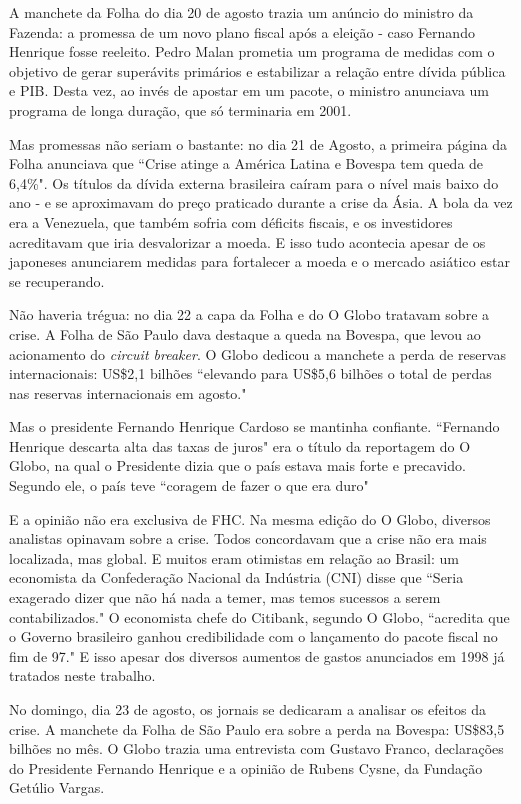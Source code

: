 \documentclass{article}
\begin{document}
A manchete da Folha do dia 20 de agosto trazia um anúncio do ministro da Fazenda: a promessa de um novo plano fiscal após a eleição - caso Fernando Henrique fosse reeleito. Pedro Malan prometia um programa de medidas com o objetivo de gerar superávits primários e estabilizar a relação entre dívida pública e PIB. Desta vez, ao invés de apostar em um pacote, o ministro anunciava um programa de longa duração, que só terminaria em 2001.

Mas promessas não seriam o bastante: no dia 21 de Agosto, a primeira página da Folha anunciava que ``Crise atinge a América Latina e Bovespa tem queda de 6,4\%". Os títulos da dívida externa brasileira caíram para o nível mais baixo do ano - e se aproximavam do preço praticado durante a crise da Ásia. A bola da vez era a Venezuela, que também sofria com déficits fiscais, e os investidores acreditavam que iria desvalorizar a moeda. E isso tudo acontecia apesar de os japoneses anunciarem medidas para fortalecer a moeda e o mercado asiático estar se recuperando.

Não haveria trégua: no dia 22 a capa da Folha e do O Globo tratavam sobre a crise. A Folha de São Paulo dava destaque a queda na Bovespa, que levou ao acionamento do \textit{circuit breaker}. O Globo dedicou a manchete a perda de reservas internacionais: US\$2,1 bilhões ``elevando para US\$5,6 bilhões o total de perdas nas reservas internacionais em agosto." 

Mas o presidente Fernando Henrique Cardoso se mantinha confiante. ``Fernando Henrique descarta alta das taxas de juros" era o título da reportagem do O Globo, na qual o Presidente dizia que o país estava mais forte e precavido. Segundo ele, o país teve ``coragem de fazer o que era duro"

E a opinião não era exclusiva de FHC. Na mesma edição do O Globo, diversos analistas opinavam sobre a crise. Todos concordavam que a crise não era mais localizada, mas global. E muitos eram otimistas em relação ao Brasil: um economista da Confederação Nacional da Indústria (CNI) disse que ``Seria exagerado dizer que não há nada a temer, mas temos sucessos a serem contabilizados." O economista chefe do Citibank, segundo O Globo, ``acredita que o Governo brasileiro ganhou credibilidade com o lançamento do pacote fiscal no fim de 97." E isso apesar dos diversos aumentos de gastos anunciados em 1998 já tratados neste trabalho.

No domingo, dia 23 de agosto, os jornais se dedicaram a analisar os efeitos da crise. A manchete da Folha de São Paulo era sobre a perda na Bovespa: US\$83,5 bilhões no mês. O Globo trazia uma entrevista com Gustavo Franco, declarações do Presidente Fernando Henrique e a opinião de Rubens Cysne, da Fundação Getúlio Vargas.
\end{document}
